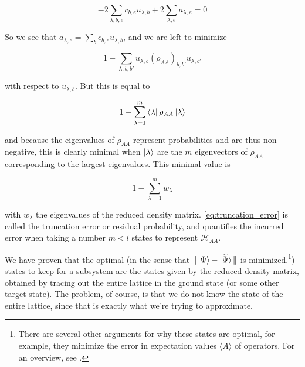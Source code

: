 \begin{equation}
  -2 \sum_{\lambda, b, e} c_{b, e} u_{\lambda, b} + 2 \sum_{\lambda, e} a_{\lambda, e} = 0
\end{equation}

So we see that $a_{\lambda, e} = \sum_{b} c_{b, e} u_{\lambda, b}$, and we are left to minimize

\begin{equation}
  1 - \sum_{\lambda, b, b'} u_{\lambda, b} (\rho_{AA})_{b, b'} u_{\lambda, b'}
\end{equation}

with respect to $u_{\lambda, b}$. But this is equal to

\begin{equation}
  1 - \sum_{\lambda = 1}^{m} \bra{\lambda} \rho_{AA} \ket{\lambda}
\end{equation}

and because the eigenvalues of $\rho_{AA}$ represent probabilities and are thus
non-negative, this is clearly minimal when $\ket{\lambda}$ are the $m$
eigenvectors of $\rho_{AA}$ corresponding to the largest eigenvalues. This minimal value is

\begin{equation}\label{eq:truncation_error}
  1 - \sum_{\lambda = 1}^{m} w_{\lambda}
\end{equation}

with $w_{\lambda}$ the eigenvalues of the reduced density matrix.
\eqref{eq:truncation_error} is called the truncation error or residual
probability, and quantifies the incurred error when taking a number $m < l$ states to
represent $\mathcal{H}_{AA}$.


We have proven that the optimal (in the sense that $\Vert \ket{\Psi}
- \ket{\widetilde{\Psi}} \Vert$ is minimized.\footnote{There are several other
arguments for why these states are optimal, for example, they minimize the
error in expectation values $\langle A \rangle$ of operators. For an overview,
see \cite{schollwock2005density}.}) states to keep for a subsystem are the
states given by the reduced density matrix, obtained by tracing out the entire
lattice in the ground state (or some other target state). The problem, of
course, is that we do not know the state of the entire lattice, since that is
exactly what we're trying to approximate. 

